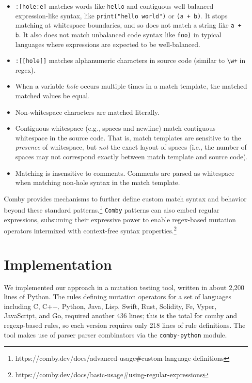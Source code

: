 \documentclass[sigconf,review, anonymous]{acmart}
\begin{document}
{\begin{itemize}
\item \texttt{\small:[hole:e]} matches words like \texttt{\small hello} and contiguous well-balanced expression-like syntax, like \texttt{\small print("hello world")} or \texttt{\small (a + b)}. It stops matching at whitespace boundaries, and so does not match a string like \texttt{\small a + b}. It also does not match unbalanced code syntax like \texttt{\small foo)} in typical languages where expressions are expected to be well-balanced.

\item \texttt{\small :[[hole]]} matches alphanumeric characters in source code (similar to \texttt{\small\textbackslash w+} in regex).

\item When a variable \emph{hole} occurs multiple times in a match template, the matched matched values be equal.

\item Non-whitespace characters are matched literally.

\item Contiguous whitespace (e.g., spaces and newline) match contiguous whitespace in the source code. That is, match templates are sensitive to the \emph{presence} of whitespace, but \emph{not} the exact layout of spaces (i.e., the number of spaces may not correspond exactly between match template and source code).

\item Matching is insensitive to comments. Comments are parsed as whitespace when matching non-hole syntax in the match template.

\end{itemize}

Comby provides mechanisms to further define custom match syntax and behavior
beyond these standard patterns.\footnote{https://comby.dev/docs/advanced-usage\#custom-language-definitions} \texttt{Comby} patterns can also embed regular expressions, subsuming their
expressive power to enable regex-based mutation operators intermixed with
context-free syntax properties.\footnote{https://comby.dev/docs/basic-usage\#using-regular-expressions}

\section{Implementation}

We implemented our approach in a mutation testing tool, written in
about 2,200 lines of Python.  The rules defining mutation operators
for a set of languages including C, C++, Python, Java, Lisp, Swift,
Rust, Solidity, Fe, Vyper, JavaScript, and Go, required another 436
lines; this is the total for comby and regexp-based rules, so each
version requires only 218 lines of rule definitions.  The tool makes
use of parser parser combinators via the {\tt comby-python} module.

}
\end{document}
